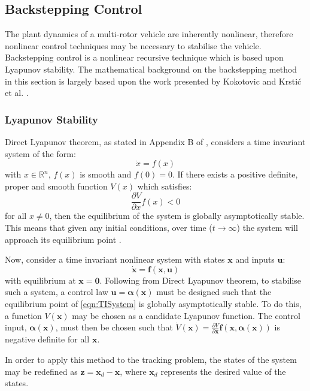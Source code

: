 \subsection{Backstepping Control}\label{section:BacksteppingBackground}
The plant dynamics of a multi-rotor vehicle are inherently nonlinear, therefore nonlinear control techniques may be necessary to stabilise the vehicle. Backstepping control is a nonlinear recursive technique which is based upon Lyapunov stability. The mathematical background on the backstepping method in this section is largely based upon the work presented by Kokotovic \cite{1992a} and Krsti\'c et al. \cite{Krstic1995}.

\subsubsection{Lyapunov Stability}
Direct Lyapunov theorem, as stated in Appendix B of \cite{Isidori1995}, considers a time invariant system of the form:
\[\dot{x}=f(x)\]
with $x\in\mathbb{R}^{n}$, $f(x)$ is smooth and $f(0)=0$. If there exists a positive definite, proper and smooth function $V(x)$ which satisfies:
\[\frac{\partial V}{\partial x}f(x)<0\]
for all $x\neq0$, then the equilibrium of the system is globally asymptotically stable. This means that given any initial conditions, over time ($t\rightarrow\infty$) the system will approach its equilibrium point \cite{Chen1999}. 

Now, consider a time invariant nonlinear system with states $\mathbf{x}$ and inputs $\mathbf{u}$:
\begin{equation}\label{eqn:TISystem}
\mathbf{\dot{x}}=\mathbf{f}(\mathbf{x},\mathbf{u})
\end{equation}
with equilibrium at $\mathbf{x}=\mathbf{0}$. Following from Direct Lyapunov theorem, to stabilise such a system, a control law $\mathbf{u}=\mathbf{\alpha}(\mathbf{x})$ must be designed such that the equilibrium point of \eqref{eqn:TISystem} is globally asymptotically stable. To do this, a function $V(\mathbf{x})$ may be chosen as a candidate Lyapunov function. The control input, $\mathbf{\alpha}(\mathbf{x})$, must then be chosen such that $\dot{V}(\mathbf{x})=\frac{\partial V}{\partial \mathbf{x}}\mathbf{f}(\mathbf{x},\mathbf{\alpha}(\mathbf{x}))$ is negative definite for all $\mathbf{x}$. 

In order to apply this method to the tracking problem, the states of the system may be redefined as $\mathbf{z}=\mathbf{x}_{d}-\mathbf{x}$, where $\mathbf{x}_{d}$ represents the desired value of the states.

